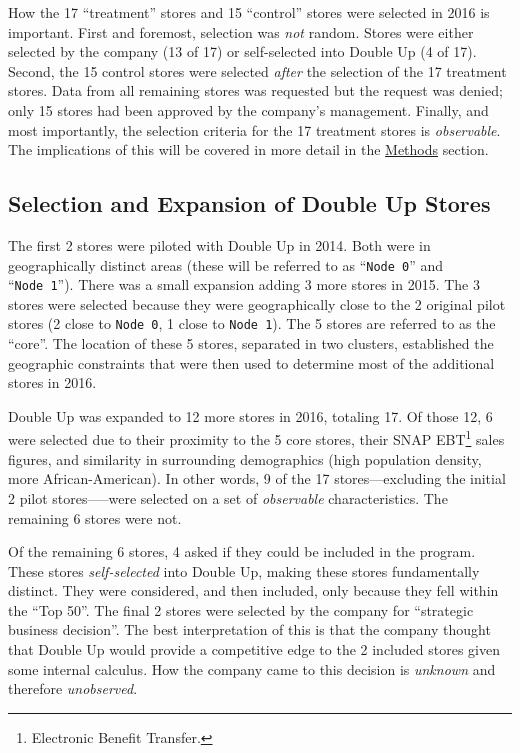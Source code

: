 \documentclass[12pt,letterpaperpaper,]{book}
\begin{document}
How the 17 ``treatment'' stores and 15 ``control'' stores were selected
in 2016 is important. First and foremost, selection was \emph{not}
random. Stores were either selected by the company (13 of 17) or
self-selected into Double Up (4 of 17). Second, the 15 control stores
were selected \emph{after} the selection of the 17 treatment stores.
Data from all remaining stores was requested but the request was denied;
only 15 stores had been approved by the company's management. Finally,
and most importantly, the selection criteria for the 17 treatment stores
is \emph{observable}. The implications of this will be covered in more
detail in the \protect\hyperlink{methods}{Methods} section.

\subsection*{Selection and Expansion of Double Up
Stores}\label{selection-and-expansion-of-double-up-stores}

The first 2 stores were piloted with Double Up in 2014. Both were in
geographically distinct areas (these will be referred to as
``\texttt{Node\ 0}'' and ``\texttt{Node\ 1}''). There was a small
expansion adding 3 more stores in 2015. The 3 stores were selected
because they were geographically close to the 2 original pilot stores (2
close to \texttt{Node\ 0}, 1 close to \texttt{Node\ 1}). The 5 stores
are referred to as the ``core''. The location of these 5 stores,
separated in two clusters, established the geographic constraints that
were then used to determine most of the additional stores in 2016.

Double Up was expanded to 12 more stores in 2016, totaling 17. Of those
12, 6 were selected due to their proximity to the 5 core stores, their
SNAP EBT\footnote{Electronic Benefit Transfer.} sales figures, and
similarity in surrounding demographics (high population density, more
African-American). In other words, 9 of the 17 stores---excluding the
initial 2 pilot stores-----were selected on a set of \emph{observable}
characteristics. The remaining 6 stores were not.

Of the remaining 6 stores, 4 asked if they could be included in the
program. These stores \emph{self-selected} into Double Up, making these
stores fundamentally distinct. They were considered, and then included,
only because they fell within the ``Top 50''. The final 2 stores were
selected by the company for ``strategic business decision''. The best
interpretation of this is that the company thought that Double Up would
provide a competitive edge to the 2 included stores given some internal
calculus. How the company came to this decision is \emph{unknown} and
therefore \emph{unobserved}.
\end{document}
